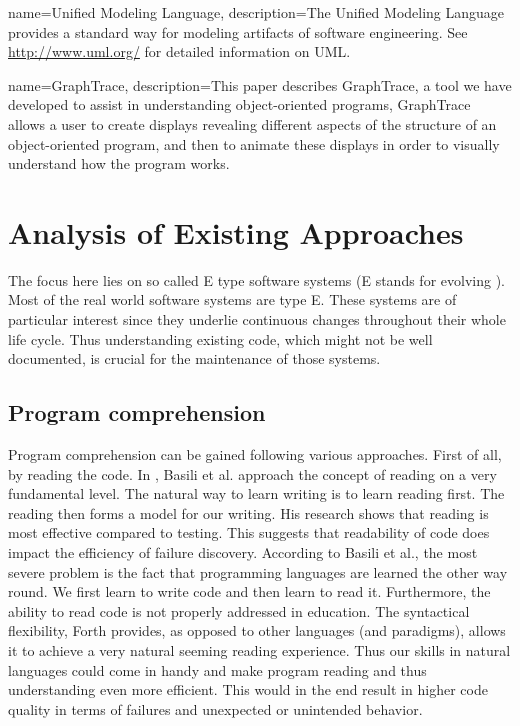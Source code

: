 {
  name={Unified Modeling Language},
  description={The Unified Modeling Language provides a standard way for modeling artifacts of software engineering. See \url{http://www.uml.org/} for detailed information on UML.}
}

{
  name={GraphTrace},
  description={This paper describes GraphTrace, a tool we have developed to assist in understanding object-oriented programs, GraphTrace allows a user to create displays revealing different aspects of the structure of an object-oriented program, and then to animate these displays in order to visually understand how the program works.}
}

\chapter{Analysis of Existing Approaches}
\label{chap:StateOfTheArt}

The focus here lies on so called E type software systems (E stands for evolving \cite{Cook:2006:ESS:1115566.1115567}). Most of the real world software systems are type E. These systems are of particular interest since they underlie continuous changes throughout their whole life cycle. Thus understanding existing code, which might not be well documented, is crucial for the maintenance of those systems.

\section{Program comprehension}

Program comprehension can be gained following various approaches. First of all, by reading the code.
In \cite{Basili:1997:EPR:257260.257262}, Basili et al. approach the concept of reading on a very fundamental level. The natural way to learn writing is to learn reading first. The reading then forms a model for our writing.  His research shows that reading is most effective compared to testing. This suggests that readability of code does impact the efficiency of failure discovery. According to Basili et al., the most severe problem is the fact that programming languages are learned the other way round. We first learn to write code and then learn to read it. Furthermore, the ability to read code is not properly addressed in education. The syntactical flexibility, Forth provides, as opposed to other languages (and paradigms), allows it to achieve a very natural seeming reading experience. Thus our skills in natural languages could come in handy and make program reading and thus understanding even more efficient. This would in the end result in higher code quality in terms of failures and unexpected or unintended behavior.

